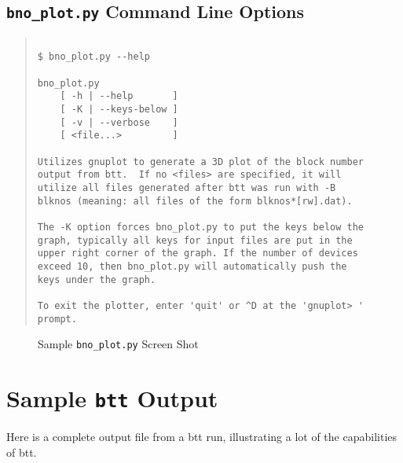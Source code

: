\documentclass{article}
\begin{document}
\subsection*{\texttt{bno\_plot.py} Command Line Options}

\begin{quotation}
\begin{verbatim}

$ bno_plot.py --help

bno_plot.py
	[ -h | --help       ]
	[ -K | --keys-below ]
	[ -v | --verbose    ]
	[ <file...>         ]

Utilizes gnuplot to generate a 3D plot of the block number
output from btt.  If no <files> are specified, it will
utilize all files generated after btt was run with -B
blknos (meaning: all files of the form blknos*[rw].dat).

The -K option forces bno_plot.py to put the keys below the
graph, typically all keys for input files are put in the
upper right corner of the graph. If the number of devices
exceed 10, then bno_plot.py will automatically push the
keys under the graph.

To exit the plotter, enter 'quit' or ^D at the 'gnuplot> '
prompt.
\end{verbatim}
\end{quotation}

\begin{figure}[b]
\leavevmode\centering
{}
\caption{\label{fig:bno_plot}Sample \texttt{bno\_plot.py} Screen Shot}
\end{figure}

\clearpage
\newpage\section{\label{sec:appendix}Sample \texttt{btt}
Output}
  Here is a complete output file from a btt run, illustrating a lot of the
  capabilities of btt.

\end{document}
